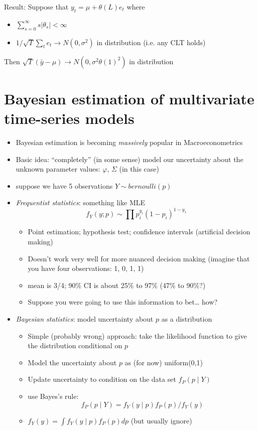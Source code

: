 Result: Suppose that $y_t = μ + θ(L) e_t$ where
\begin{itemize}
\item $∑_{s=0}^∞ s |θ_s| < ∞$
\item $1/\sqrt{T} ∑_t e_t → N(0, σ^2)$ in distribution (i.e. any CLT
  holds)
\end{itemize}
Then $\sqrt{T} (\bar y - μ ) → N( 0, σ^2 θ(1)^2 )$ in distribution

\section{Bayesian estimation of multivariate time-series models}
\begin{itemize}
\item Bayesian estimation is becoming \emph{massively} popular in
  Macroeconometrics
\item Basic idea: ``completely'' (in some sense) model our uncertainty
  about the unknown parameter values: $φ$, $Σ$ (in this case)
\item suppose we have 5 observations $Y ∼ bernoulli(p)$
\item \emph{Frequentist statistics}: something like MLE
  \[f_Y(y; p) ∼ ∏ p_i^{y_i} (1 - p_i)^{1 - y_1}\]
  \begin{itemize}
  \item Point estimation; hypothesis test; confidence intervals
    (artificial decision making)
  \item Doesn't work very well for more nuanced decision making
    (imagine that you have four observations: 1, 0, 1, 1)
  \item mean is 3/4; 90\% CI is about 25\% to 97\% (47\% to 90\%?)
  \item Suppose you were going to use this information to bet… how?
  \end{itemize}
\item \emph{Bayesian statistics}: model uncertainty about $p$ as a
  distribution
  \begin{itemize}
  \item Simple (probably wrong) approach: take the likelihood function
    to give the distribution conditional on $p$
  \item Model the uncertainty about $p$ as (for now) uniform(0,1)
  \item Update uncertainty to condition on the data set $f_P(p ∣ Y)$
  \item use Bayes's rule:
    \[f_P(p ∣ Y) = f_Y(y ∣ p) f_P(p) / f_Y(y)\]
  \item $f_Y(y) = ∫ f_Y(y ∣ p) f_P(p) dp$ (but usually ignore)

\end{itemize}
\end{itemize}
